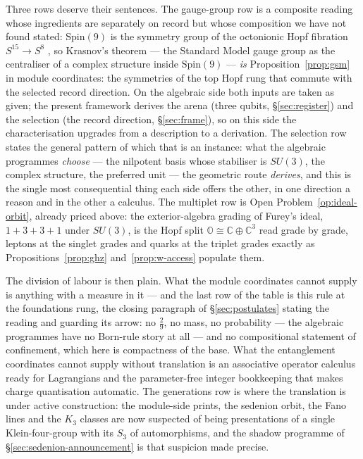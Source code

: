Three rows deserve their sentences. The gauge-group row is a composite reading whose ingredients
are separately on record but whose composition we have not found stated: $\mathrm{Spin}(9)$ is
the symmetry group of the octonionic Hopf fibration $S^{15} \to S^8$
\autocite{partonpiccinni2018spin9}, so Krasnov's theorem --- the Standard Model gauge group as the centraliser of a
complex structure inside $\mathrm{Spin}(9)$ --- \emph{is} Proposition~\ref{prop:gsm} in module
coordinates: the symmetries of the top Hopf rung that commute with the selected record direction.
On the algebraic side both inputs are taken as given; the present framework derives the arena
(three qubits, \S\ref{sec:register}) and the selection (the record direction, \S\ref{sec:frame}),
so on this side the characterisation upgrades from a description to a derivation. The selection
row states the general pattern of which that is an instance: what the algebraic programmes
\emph{choose} --- the nilpotent basis whose stabiliser is $SU(3)$, the complex structure, the
preferred unit --- the geometric route \emph{derives}, and this is the single most consequential
thing each side offers the other, in one direction a reason and in the other a calculus. The
multiplet row is Open Problem~\ref{op:ideal-orbit}, already priced above: the exterior-algebra
grading of Furey's ideal, $1{+}3{+}3{+}1$ under $SU(3)$, is the Hopf split
$\mathbb{O} \cong \mathbb{C}\oplus\mathbb{C}^3$ read grade by grade, leptons at the singlet
grades and quarks at the triplet grades exactly as Propositions~\ref{prop:ghz}
and~\ref{prop:w-access} populate them.

The division of labour is then plain. What the module coordinates cannot supply is anything with
a measure in it --- and the last row of the table is this rule at the foundations rung, the
closing paragraph of \S\ref{sec:postulates} stating the reading and guarding its arrow: no $\tfrac29$,
no mass, no probability --- the algebraic programmes have no
Born-rule story at all --- and no compositional statement of confinement, which here is
compactness of the base. What the entanglement coordinates cannot supply without translation is
an associative operator calculus ready for Lagrangians and the parameter-free integer bookkeeping
that makes charge quantisation automatic. The generations row is where the translation is under
active construction: the module-side prints, the sedenion orbit, the Fano lines and the $K_3$
classes are now suspected of being presentations of a single Klein-four-group with its $S_3$ of
automorphisms, and the shadow programme of \S\ref{sec:sedenion-announcement} is that suspicion
made precise.

